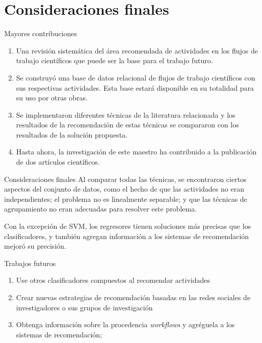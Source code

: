 \section{Consideraciones finales}

\begin{frame}
  	\begin{block}{Mayores contribuciones}
  		\begin{enumerate}
  			\item Una revisión sistemática del área recomendada de actividades en los flujos de trabajo científicos que puede ser la base para el trabajo futuro.
  			\item Se construyó una base de datos relacional de flujos de trabajo científicos con sus respectivas actividades. Esta base estará disponible en su totalidad para su uso por otras obras.
  			\item Se implementaron diferentes técnicas de la literatura relacionada y los resultados de la recomendación de estas técnicas se compararon con los resultados de la solución propuesta.
  			\item Hasta ahora, la investigación de este maestro ha contribuido a la publicación de dos artículos científicos.
  		\end{enumerate}
  		
  	\end{block}
  \end{frame}
	
	\begin{frame}
		\begin{block}{Consideraciones finales}
			Al comparar todas las técnicas, se encontraron ciertos aspectos del conjunto de datos, como el hecho de que las actividades no eran independientes; el problema no es linealmente separable; y que las técnicas de agrupamiento no eran adecuadas para resolver este problema. 
			
			Con la excepción de SVM, los regresores tienen soluciones más precisas que los clasificadores, y también agregan información a los sistemas de recomendación mejoró su precisión.
		\end{block}
	\end{frame}

 \begin{frame}
 	\begin{block}{Trabajos futuros}
 		\begin{enumerate}
 			\item Use otros clasificadores compuestos al recomendar actividades
 			\item Crear nuevas estrategias de recomendación basadas en las redes sociales de investigadores o sus grupos de investigación
 			\item Obtenga información sobre la procedencia \emph{workflows} y agréguela a los sistemas de recomendación;
 		
		\end{enumerate}		
 	\end{block}
 \end{frame}
 
